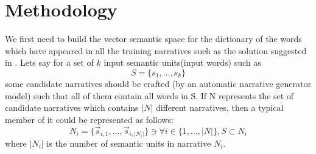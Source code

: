 \documentclass{article}
\begin{document}
	\section{Methodology}
	We first need to build the vector semantic space for the dictionary of the words which have appeared in all the training narratives such as the solution suggested in \citet{m}. Lets say for a set of $k$ input semantic units(input words) such as 
	\begin{equation}
		S =\{s_1,...,s_{k}\}
	\end{equation}	
	some candidate narratives should be crafted (by an automatic narrative generator model) such that all of them contain all words in S. If N represents the set of candidate narratives which contains $|N|$ different narratives, then a typical member of it could be represented as follows:
	\begin{equation}
		N_i=\{\vec{s}_{i,1},...,\vec{s}_{i,|N_i|}\} \ni \forall i\in\{1,...,|N|\} , S \subset N_i
	\end{equation}
	where $|N_i|$ is the number of semantic units in narrative $N_i$. 
	
\end{document}
